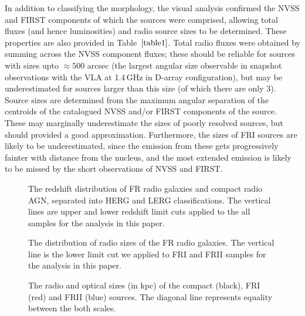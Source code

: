 \documentclass[usenatbib]{mn2e}
\begin{document}
In addition to classifying the morphology, the visual analysis confirmed
the NVSS and FIRST components of which the sources were comprised,
allowing total fluxes (and hence luminosities) and radio source sizes to
be determined. These properties are also provided in
Table~$\ref{table1}$. Total radio fluxes were obtained by summing across
the NVSS component fluxes; these should be reliable for sources with sizes
upto $\approx 500$ arcsec (the largest angular size observable in snapshot
observations with the VLA at 1.4\,GHz in D-array configuration), but may
be underestimated for sources larger than this size (of which there are
only 3).  Source sizes are determined from the maximum angular separation
of the centroids of the catalogued NVSS and/or FIRST components of the
source. These may marginally underestimate the sizes of poorly resolved
sources, but should provided a good approximation. Furthermore, the sizes
of FRI sources are likely to be underestimated, since the emission from
these gets progressively fainter with distance from the nucleus, and the
most extended emission is likely to be missed by the short observations of
NVSS and FIRST.







\begin{figure}
\center
{}
\caption{The redshift distribution of FR radio galaxies and compact radio
  AGN, separated into HERG and LERG classifications. The vertical lines
  are upper and lower redshift limit cuts applied to the all samples for
  the analysis in this paper.}
\label{RedshiftDis}
\end{figure}

\begin{figure}
\center
{}
\caption{The distribution of radio sizes of the FR radio galaxies. The
  vertical line is the lower limit cut we applied to FRI and FRII
  samples for the analysis in this paper.}
\label{RadioSize}
\end{figure}

\begin{figure}
\center
{}
\caption{The radio and optical sizes (in kpc) of the compact (black), FRI (red) and FRII (blue) sources. 
The diagonal line represents equality between the both scales.}
\label{Physize}
\end{figure}
\end{document}
